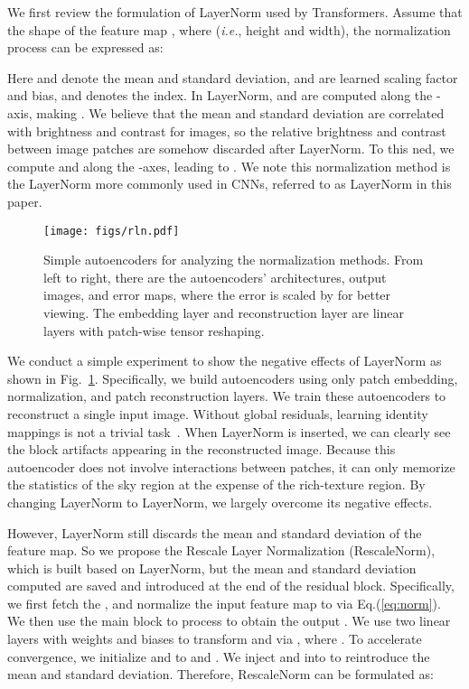 \documentclass[journal]{IEEEtran}
\begin{document}
We first review the formulation of LayerNorm used by Transformers.
Assume that the shape of the feature map , where  (\emph{i.e.}, height and width), the normalization process can be expressed as:

Here  and  denote the mean and standard deviation,  and  are learned scaling factor and bias, and  denotes the index.
In LayerNorm,  and  are computed along the -axis, making .
We believe that the mean and standard deviation are correlated with brightness and contrast for images, so the relative brightness and contrast between image patches are somehow discarded after LayerNorm.
To this ned, we compute  and  along the -axes, leading to .
We note this normalization method is the LayerNorm more commonly used in CNNs, referred to as LayerNorm in this paper.

\begin{figure}[t]
    \centering
    \texttt{[image: figs/rln.pdf]}
    \caption{
        Simple autoencoders for analyzing the normalization methods.
        From left to right, there are the autoencoders' architectures, output images, and error maps, where the error is scaled by  for better viewing.
        The embedding layer and reconstruction layer are linear layers with patch-wise tensor reshaping.
    }
    \label{fig:rln}
\end{figure}

We conduct a simple experiment to show the negative effects of LayerNorm as shown in Fig.~\ref{fig:rln}.
Specifically, we build autoencoders using only patch embedding, normalization, and patch reconstruction layers.
We train these autoencoders to reconstruct a single input image.
Without global residuals, learning identity mappings is not a trivial task~\cite{he2016deep}.
When LayerNorm is inserted, we can clearly see the block artifacts appearing in the reconstructed image.
Because this autoencoder does not involve interactions between patches, it can only memorize the statistics of the sky region at the expense of the rich-texture region.
By changing LayerNorm to LayerNorm, we largely overcome its negative effects.

However, LayerNorm still discards the mean and standard deviation of the feature map.
So we propose the Rescale Layer Normalization (RescaleNorm), which is built based on LayerNorm, but the mean and standard deviation computed are saved and introduced at the end of the residual block.
Specifically, we first fetch the , and normalize the input feature map  to  via Eq.(\ref{eq:norm}).
We then use the main block  to process  to obtain the output .
We use two linear layers with weights  and biases  to transform  and  via , where .
To accelerate convergence, we initialize   and  to  and .
We inject  and  into  to reintroduce the mean and standard deviation.
Therefore, RescaleNorm can be formulated as:
\end{document}
